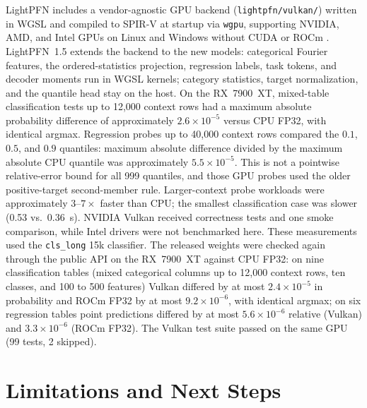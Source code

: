 \documentclass[11pt]{article}
\begin{document}
LightPFN includes a vendor-agnostic GPU backend (\texttt{lightpfn/vulkan/}) written in WGSL and compiled to SPIR-V at startup via \texttt{wgpu}, supporting NVIDIA, AMD, and Intel GPUs on Linux and Windows without CUDA or ROCm \cite[Section~11.1]{ottoboni2026lightpfn}.
LightPFN~1.5 extends the backend to the new models: categorical Fourier features, the ordered-statistics projection, regression labels, task tokens, and decoder moments run in WGSL kernels; category statistics, target normalization, and the quantile head stay on the host. On the RX~7900~XT, mixed-table classification tests up to 12,000 context rows had a maximum absolute probability difference of approximately $2.6\times10^{-5}$ versus CPU FP32, with identical argmax. Regression probes up to 40,000 context rows compared the $0.1$, $0.5$, and $0.9$ quantiles: maximum absolute difference divided by the maximum absolute CPU quantile was approximately $5.5\times10^{-5}$. This is not a pointwise relative-error bound for all 999 quantiles, and those GPU probes used the older positive-target second-member rule. Larger-context probe workloads were approximately $3$--$7\times$ faster than CPU; the smallest classification case was slower (0.53 vs.\ 0.36~s). NVIDIA Vulkan received correctness tests and one smoke comparison, while Intel drivers were not benchmarked here. These measurements used the \texttt{cls\_long} 15k classifier. The released weights were checked again through the public API on the RX~7900~XT against CPU FP32: on nine classification tables (mixed categorical columns up to 12,000 context rows, ten classes, and 100 to 500 features) Vulkan differed by at most $2.4\times10^{-5}$ in probability and ROCm FP32 by at most $9.2\times10^{-6}$, with identical argmax; on six regression tables point predictions differed by at most $5.6\times10^{-6}$ relative (Vulkan) and $3.3\times10^{-6}$ (ROCm FP32). The Vulkan test suite passed on the same GPU (99 tests, 2 skipped). %

\section{Limitations and Next Steps}
\label{sec:limitations}
\end{document}
